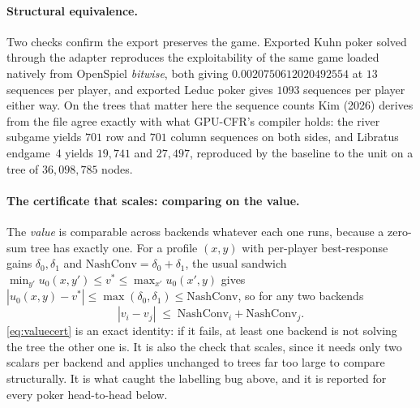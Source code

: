 \paragraph{Structural equivalence.}
Two checks confirm the export preserves the game. Exported Kuhn poker solved through the
adapter reproduces the exploitability of the same game loaded natively from OpenSpiel
\emph{bitwise}, both giving $0.0020750612020492554$ at $13$ sequences per player, and exported
Leduc poker gives $1093$ sequences per player either way. On the trees that matter here
the sequence counts Kim (2026) derives from the file agree exactly with what GPU-CFR's
compiler holds: the river subgame yields $701$ row and $701$ column sequences on
both sides, and Libratus endgame~4 yields $19{,}741$ and $27{,}497$, reproduced by
the baseline to the unit on a tree of $36{,}098{,}785$ nodes.

\paragraph{The certificate that scales: comparing on the value.}
The \emph{value} is comparable across backends whatever each one runs, because a
zero-sum tree has exactly one. For a
profile $(x,y)$ with per-player best-response gains $\delta_0, \delta_1$ and
$\mathrm{NashConv} = \delta_0 + \delta_1$, the usual sandwich
$\min_{y'} u_0(x,y') \le v^\ast \le \max_{x'} u_0(x',y)$ gives
$|u_0(x,y) - v^\ast| \le \max(\delta_0,\delta_1) \le \mathrm{NashConv}$, so for any two
backends
%
\begin{equation}
    |v_i - v_j| \;\le\; \mathrm{NashConv}_i + \mathrm{NashConv}_j .
    \label{eq:valuecert}
\end{equation}
%
\cref{eq:valuecert} is an exact identity: if it fails, at least one backend is
not solving the tree the other one is. It is also the check that scales, since it needs
only two scalars per backend and applies unchanged to trees far too large to compare
structurally. It is what caught the labelling bug above, and it is reported for every
poker head-to-head below.

